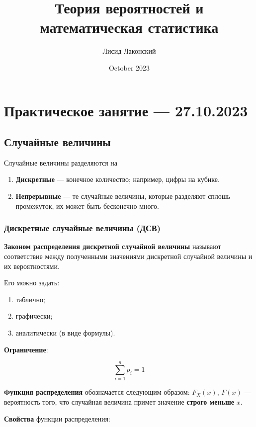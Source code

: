 \documentclass{article}
\title{Теория вероятностей и математическая статистика}
\author{Лисид Лаконский}
\date{October 2023}
\begin{document}
\raggedright

\maketitle

\tableofcontents
\pagebreak

\section{Практическое занятие — 27.10.2023}

\subsection{Случайные величины}

Случайные величины разделяются на

\begin{enumerate}
    \item \textbf{Дискретные} — конечное количество; например, цифры на кубике.
    \item \textbf{Непрерывные} — те случайные величины, которые разделяют сплошь промежуток, их может быть бесконечно много.
\end{enumerate}

\subsubsection{Дискретные случайные величины (ДСВ)}

\textbf{Законом распределения дискретной случайной величины} называют соответствие между полученными значениями дискретной случайной величины и их вероятностями.

Его можно задать:

\begin{enumerate}
    \item таблично;
    \item графически;
    \item аналитически (в виде формулы).
\end{enumerate}

\textbf{Ограничение}:

$$
\sum\limits_{i = 1}^{n} p_{i} = 1
$$

\textbf{Функция распределения} обозначается следующим образом: $F_{X}(x)$, $F(x)$ — вероятность того, что случайная величина примет значение \textbf{строго меньше} $x$.

\textbf{Свойства} функции распределения:
\end{document}
